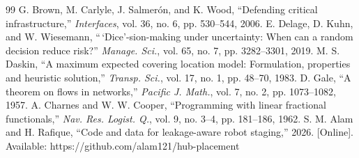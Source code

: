 \documentclass[letterpaper,journal]{IEEEtran}
\theoremstyle{remark}
\begin{document}
\begin{thebibliography}{99}
 G. Brown, M. Carlyle, J. Salmer\'on, and K. Wood, ``Defending critical infrastructure,'' \emph{Interfaces}, vol. 36, no. 6, pp. 530--544, 2006.
 E. Delage, D. Kuhn, and W. Wiesemann, ``\,`Dice'-sion-making under uncertainty: When can a random decision reduce risk?'' \emph{Manage. Sci.}, vol. 65, no. 7, pp. 3282--3301, 2019.
 M. S. Daskin, ``A maximum expected covering location model: Formulation, properties and heuristic solution,'' \emph{Transp. Sci.}, vol. 17, no. 1, pp. 48--70, 1983.
 D. Gale, ``A theorem on flows in networks,'' \emph{Pacific J. Math.}, vol. 7, no. 2, pp. 1073--1082, 1957.
 A. Charnes and W. W. Cooper, ``Programming with linear fractional functionals,'' \emph{Nav. Res. Logist. Q.}, vol. 9, no. 3--4, pp. 181--186, 1962.
 S. M. Alam and H. Rafique, ``Code and data for leakage-aware robot staging,'' 2026. [Online]. Available: https://github.com/alam121/hub-placement
\end{thebibliography}
\end{document}
